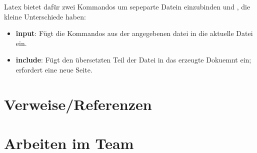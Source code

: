 \documentclass[a4paper, parskip=half]{scrartcl}
\begin{document}
Latex bietet dafür zwei Kommandos um sepeparte Datein einzubinden \verb++ und \verb++,
die kleine Unterschiede haben:
\begin{itemize}
  \item \textbf{input}: Fügt die Kommandos aus der angegebenen datei in die aktuelle Datei ein.
  \item \textbf{include}: Fügt den übersetzten Teil der Datei in das erzeugte Dokuemnt ein; erfordert eine neue
    Seite. 
\end{itemize}
\section{Verweise/Referenzen}
\section{Arbeiten im Team}
\end{document}
